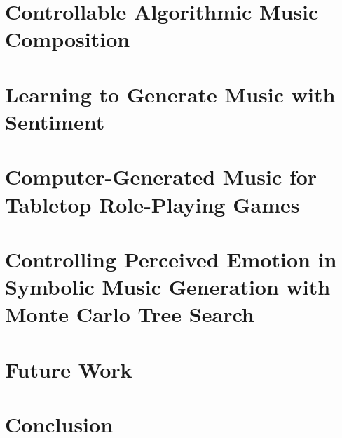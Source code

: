 \documentclass[11pt]{ucscthesis}
\begin{document}
\chapter{Controllable Algorithmic Music Composition}
\label{ch:related}


\chapter{Learning to Generate Music with Sentiment}
\label{ch:ismir19}


\chapter{Computer-Generated Music for Tabletop Role-Playing Games}
\label{ch:aiide20}


\chapter{Controlling Perceived Emotion in Symbolic Music Generation with Monte Carlo Tree Search}
\label{ch:ismir21}


% 

\chapter{Future Work}
\label{ch:future}


\chapter{Conclusion}
\label{ch:conclusion}


% 



\def\baselinestretch{1.0}\large\normalsize

% 


\end{document}
